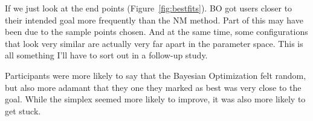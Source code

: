 If we just look at the end points (Figure~\ref{fig:bestfits}).
BO got users closer to their intended goal more frequently than the NM method.
Part of this may have been due to the sample points chosen.
And at the same time, some configurations that look very similar are actually very far apart in the parameter space.
This is all something I'll have to sort out in a follow-up study.

Participants were more likely to say that the Bayesian Optimization felt random, but also more adamant that they one they marked as best was very close to the goal.
While the simplex seemed more likely to improve, it was also more likely to get stuck.
